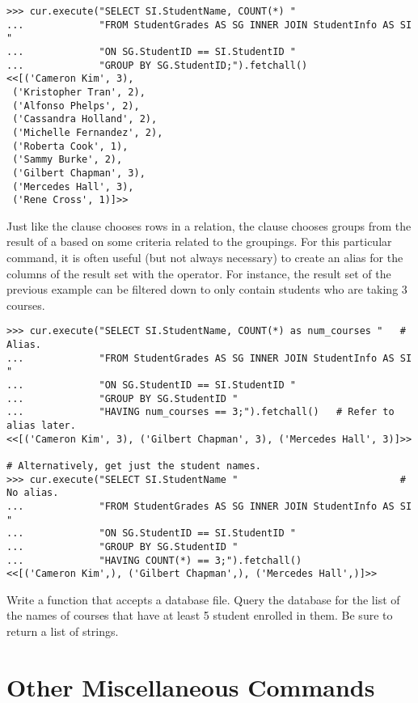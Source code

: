 \begin{lstlisting}
>>> cur.execute("SELECT SI.StudentName, COUNT(*) "
...             "FROM StudentGrades AS SG INNER JOIN StudentInfo AS SI "
...             "ON SG.StudentID == SI.StudentID "
...             "GROUP BY SG.StudentID;").fetchall()
<<[('Cameron Kim', 3),
 ('Kristopher Tran', 2),
 ('Alfonso Phelps', 2),
 ('Cassandra Holland', 2),
 ('Michelle Fernandez', 2),
 ('Roberta Cook', 1),
 ('Sammy Burke', 2),
 ('Gilbert Chapman', 3),
 ('Mercedes Hall', 3),
 ('Rene Cross', 1)]>>
\end{lstlisting}

Just like the  clause chooses rows in a relation, the  clause chooses groups from the result of a  based on some criteria related to the groupings.
For this particular command, it is often useful (but not always necessary) to create an alias for the columns of the result set with the  operator.
For instance, the result set of the previous example can be filtered down to only contain students who are taking 3 courses.

\begin{lstlisting}
>>> cur.execute("SELECT SI.StudentName, COUNT(*) as num_courses "   # Alias.
...             "FROM StudentGrades AS SG INNER JOIN StudentInfo AS SI "
...             "ON SG.StudentID == SI.StudentID "
...             "GROUP BY SG.StudentID "
...             "HAVING num_courses == 3;").fetchall()   # Refer to alias later.
<<[('Cameron Kim', 3), ('Gilbert Chapman', 3), ('Mercedes Hall', 3)]>>

# Alternatively, get just the student names.
>>> cur.execute("SELECT SI.StudentName "                            # No alias.
...             "FROM StudentGrades AS SG INNER JOIN StudentInfo AS SI "
...             "ON SG.StudentID == SI.StudentID "
...             "GROUP BY SG.StudentID "
...             "HAVING COUNT(*) == 3;").fetchall()
<<[('Cameron Kim',), ('Gilbert Chapman',), ('Mercedes Hall',)]>>
\end{lstlisting}

\begin{problem} %
Write a function that accepts a database file.
Query the database for the list of the names of courses that have at least 5 student enrolled in them.
Be sure to return a list of strings.
\end{problem}

\section*{Other Miscellaneous Commands} %

